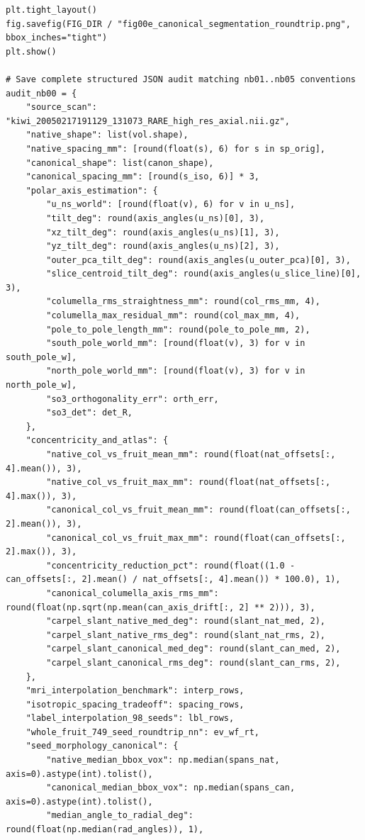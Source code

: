 \documentclass[10pt,a4paper]{article}
\renewcommand{\_}{\origunderscore\allowbreak}
\begin{document}
\begin{codebox}
\begin{lstlisting}[style=pybmed]
plt.tight_layout()
fig.savefig(FIG_DIR / "fig00e_canonical_segmentation_roundtrip.png", bbox_inches="tight")
plt.show()

# Save complete structured JSON audit matching nb01..nb05 conventions
audit_nb00 = {
    "source_scan": "kiwi_20050217191129_131073_RARE_high_res_axial.nii.gz",
    "native_shape": list(vol.shape),
    "native_spacing_mm": [round(float(s), 6) for s in sp_orig],
    "canonical_shape": list(canon_shape),
    "canonical_spacing_mm": [round(s_iso, 6)] * 3,
    "polar_axis_estimation": {
        "u_ns_world": [round(float(v), 6) for v in u_ns],
        "tilt_deg": round(axis_angles(u_ns)[0], 3),
        "xz_tilt_deg": round(axis_angles(u_ns)[1], 3),
        "yz_tilt_deg": round(axis_angles(u_ns)[2], 3),
        "outer_pca_tilt_deg": round(axis_angles(u_outer_pca)[0], 3),
        "slice_centroid_tilt_deg": round(axis_angles(u_slice_line)[0], 3),
        "columella_rms_straightness_mm": round(col_rms_mm, 4),
        "columella_max_residual_mm": round(col_max_mm, 4),
        "pole_to_pole_length_mm": round(pole_to_pole_mm, 2),
        "south_pole_world_mm": [round(float(v), 3) for v in south_pole_w],
        "north_pole_world_mm": [round(float(v), 3) for v in north_pole_w],
        "so3_orthogonality_err": orth_err,
        "so3_det": det_R,
    },
    "concentricity_and_atlas": {
        "native_col_vs_fruit_mean_mm": round(float(nat_offsets[:, 4].mean()), 3),
        "native_col_vs_fruit_max_mm": round(float(nat_offsets[:, 4].max()), 3),
        "canonical_col_vs_fruit_mean_mm": round(float(can_offsets[:, 2].mean()), 3),
        "canonical_col_vs_fruit_max_mm": round(float(can_offsets[:, 2].max()), 3),
        "concentricity_reduction_pct": round(float((1.0 - can_offsets[:, 2].mean() / nat_offsets[:, 4].mean()) * 100.0), 1),
        "canonical_columella_axis_rms_mm": round(float(np.sqrt(np.mean(can_axis_drift[:, 2] ** 2))), 3),
        "carpel_slant_native_med_deg": round(slant_nat_med, 2),
        "carpel_slant_native_rms_deg": round(slant_nat_rms, 2),
        "carpel_slant_canonical_med_deg": round(slant_can_med, 2),
        "carpel_slant_canonical_rms_deg": round(slant_can_rms, 2),
    },
    "mri_interpolation_benchmark": interp_rows,
    "isotropic_spacing_tradeoff": spacing_rows,
    "label_interpolation_98_seeds": lbl_rows,
    "whole_fruit_749_seed_roundtrip_nn": ev_wf_rt,
    "seed_morphology_canonical": {
        "native_median_bbox_vox": np.median(spans_nat, axis=0).astype(int).tolist(),
        "canonical_median_bbox_vox": np.median(spans_can, axis=0).astype(int).tolist(),
        "median_angle_to_radial_deg": round(float(np.median(rad_angles)), 1),

\end{lstlisting}
\end{codebox}
\end{document}
